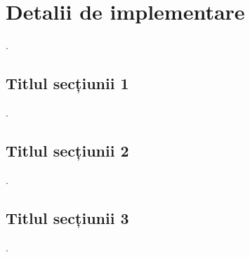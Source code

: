 \chapter{Detalii de implementare}
.

\section{Titlul secțiunii 1}

.

\section{Titlul secțiunii 2}

.

\section{Titlul secțiunii 3}

.